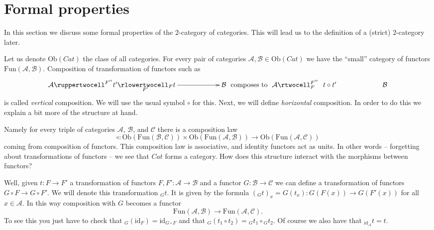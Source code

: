 \section{Formal properties}
\label{section-formal-cat-cat}

\noindent
In this section we discuss some formal properties of the
$2$-category of categories. This will lead us to the definition
of a (strict) $2$-category later.

\medskip\noindent
Let us denote $\text{Ob}(\textit{Cat})$ the class of all categories.
For every pair of categories
$\mathcal{A}, \mathcal{B} \in \text{Ob}(\textit{Cat})$
we have the ``small'' category of functors
$\text{Fun}(\mathcal{A}, \mathcal{B})$.
Composition of transformation of functors such as
$$
\xymatrixcolsep{5pc}
\xymatrix{
\mathcal{A}
\ruppertwocell^{F''}{t'}
\ar[r]_(.3){F'}
\rlowertwocell_{F}{t}
&
\mathcal{B}
}
\text{ composes to }
\xymatrix{
\mathcal{A}
\rtwocell^{F''}_{F}{\ \ t \circ t'}
&
\mathcal{B}
}
$$
is called {\it vertical} composition. We will use the usual
symbol $\circ$ for this. Next, we will define {\it horizontal}
composition. In order to do this we explain a bit more
of the structure at hand.

\medskip\noindent
Namely for every triple
of categories $\mathcal{A}$, $\mathcal{B}$, and $\mathcal{C}$
there is a composition law
$$
\circ : \text{Ob}(\text{Fun}(\mathcal{B}, \mathcal{C}))
\times
\text{Ob}(\text{Fun}(\mathcal{A}, \mathcal{B}))
\longrightarrow
\text{Ob}(\text{Fun}(\mathcal{A}, \mathcal{C}))
$$
coming from composition of functors. This composition law
is associative, and identity functors act as units. In other
words -- forgetting about transformations of functors --
we see that $\textit{Cat}$ forms a category. How does
this structure interact with the morphisms between functors?

\medskip\noindent
Well, given $t : F \to F'$ a transformation of
functors $F, F' : \mathcal{A} \to \mathcal{B}$ and
a functor
$G : \mathcal{B} \to \mathcal{C}$ we can define
a transformation of functors
$G\circ F \to G \circ F'$. We will denote this
transformation ${}_Gt$. It is given by the formula
$({}_Gt)_x = G(t_x) : G(F(x)) \to G(F'(x))$
for all $x \in \mathcal{A}$.
In this way composition
with $G$ becomes a functor
$$
\text{Fun}(\mathcal{A}, \mathcal{B})
\longrightarrow
\text{Fun}(\mathcal{A}, \mathcal{C}).
$$
To see this you just have to check that
${}_G(\text{id}_F) = \text{id}_{G \circ F}$ and that
${}_G(t_1 \circ t_2) = {}_Gt_1 \circ {}_Gt_2$.
Of course we also have that ${}_{\text{id}_{\mathcal{A}}}t = t$.

